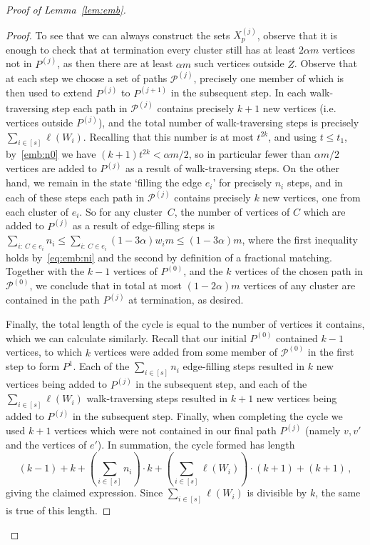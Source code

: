\documentclass[12pt,a4paper]{amsart}
\newcommand{\oldqed}{}
\def\endofClaim{\hfill\scalebox{.6}{$\Box$}}
\newenvironment{claimproof}[1][Proof]{
  \renewcommand{\oldqed}{\qedsymbol}
  \renewcommand{\qedsymbol}{\endofClaim}
  \begin{proof}[#1]
}{
  \end{proof}
  \renewcommand{\qedsymbol}{\oldqed}
}
\newcommand{\paths}{\mathscr{P}}
\begin{document}
\begin{proof}[Proof of Lemma~\ref{lem:emb}]
\begin{claimproof}
 To see that we can always
 construct the sets $X^{(j)}_p$, observe that it is enough to check that at
 termination every cluster still has at least $2\alpha m$ vertices not in
 $P^{(j)}$, as then there are at least $\alpha m$ such vertices outside $Z$. 
 Observe that at each step we choose a set of paths $\paths^{(j)}$, precisely one member of which is then used to extend $P^{(j)}$ to $P^{(j+1)}$ in the subsequent step. 
 In each walk-traversing step each path in $\paths^{(j)}$ contains precisely $k+1$ new vertices (i.e. vertices outside $P^{(j)}$), and the total number of walk-traversing steps is precisely $\sum_{i \in [s]} \ell(W_i)$. Recalling that this number is at most $t^{2k}$, and using $t \leq t_1$, by~\eqref{emb:n0} we have $(k+1)t^{2k}
< \alpha m/2$, so in particular fewer than $\alpha m/2$ vertices are added to $P^{(j)}$ as a result of walk-traversing steps. On the
 other hand, we remain in the state `filling the edge $e_i$' for precisely
 $n_i$ steps, and in each of these steps each path in $\paths^{(j)}$ contains
 precisely $k$ new vertices, one from each cluster of $e_i$. So for any cluster~$C$, the number of vertices of $C$ which are added to $P^{(j)}$ as a result of edge-filling steps is
 $\sum_{i :~C \in e_i} n_i \leq \sum_{i :~C \in e_i} (1-3\alpha) w_i m \leq
 (1-3\alpha) m$, where the first inequality holds by~\eqref{eq:emb:ni} and the
 second by definition of a fractional matching. Together with the $k-1$ vertices of $P^{(0)}$, and the $k$ vertices of the chosen path in $\paths^{(0)}$, we conclude that in total at
 most $(1-2\alpha) m$ vertices of any cluster are contained in the path $P^{(j)}$ at termination, as desired.
 
Finally, the total length of the cycle is equal to the number of vertices it contains, which we can calculate similarly. Recall that our initial $P^{(0)}$ contained $k-1$ vertices, to which $k$ vertices were added from some member of $\paths^{(0)}$ in the first step to form $P^{1}$. Each of the $\sum_{i \in [s]} n_i$ edge-filling steps resulted in $k$ new vertices being added to $P^{(j)}$ in the subsequent step, and each of the $\sum_{i \in [s]} \ell(W_i)$ walk-traversing steps resulted in $k+1$ new vertices being added to $P^{(j)}$ in the subsequent step. Finally, when completing the cycle we used $k+1$ vertices which were not contained in our final path $P^{(j)}$ (namely $v, v'$ and the vertices of $e'$). In summation, the cycle formed has length
\[(k-1)+k + \left(\sum_{i \in [s]} n_i\right) \cdot k + \left(\sum_{i \in [s]} \ell(W_i)\right) \cdot (k+1) + (k+1)\,,\]
giving the claimed expression. Since $\sum_{i \in [s]} \ell(W_i)$ is divisible by $k$, the same is true of this length.
\end{claimproof}


\end{proof}
\end{document}
